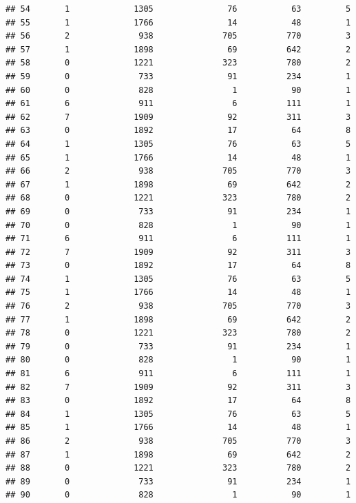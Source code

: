 \documentclass[
]{article}
\begin{document}
\begin{verbatim}
## 54       1             1305               76           63         5
## 55       1             1766               14           48         1
## 56       2              938              705          770         3
## 57       1             1898               69          642         2
## 58       0             1221              323          780         2
## 59       0              733               91          234         1
## 60       0              828                1           90         1
## 61       6              911                6          111         1
## 62       7             1909               92          311         3
## 63       0             1892               17           64         8
## 64       1             1305               76           63         5
## 65       1             1766               14           48         1
## 66       2              938              705          770         3
## 67       1             1898               69          642         2
## 68       0             1221              323          780         2
## 69       0              733               91          234         1
## 70       0              828                1           90         1
## 71       6              911                6          111         1
## 72       7             1909               92          311         3
## 73       0             1892               17           64         8
## 74       1             1305               76           63         5
## 75       1             1766               14           48         1
## 76       2              938              705          770         3
## 77       1             1898               69          642         2
## 78       0             1221              323          780         2
## 79       0              733               91          234         1
## 80       0              828                1           90         1
## 81       6              911                6          111         1
## 82       7             1909               92          311         3
## 83       0             1892               17           64         8
## 84       1             1305               76           63         5
## 85       1             1766               14           48         1
## 86       2              938              705          770         3
## 87       1             1898               69          642         2
## 88       0             1221              323          780         2
## 89       0              733               91          234         1
## 90       0              828                1           90         1

\end{verbatim}
\end{document}

